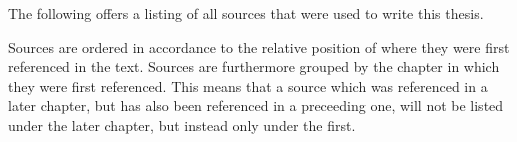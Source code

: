 %
%
%
%
%


\begin{litbib}[Bibliography]{
	The following offers a listing of all sources that were used to write this thesis.

	Sources are ordered in accordance to the relative position of where they were first referenced in the text.
	Sources are furthermore grouped by the chapter in which they were first referenced.
	This means that a source which was referenced in a later chapter, but has also been referenced in a preceeding one, will not be listed under the later chapter, but instead only under the first.
}
	{}%

\end{litbib}
